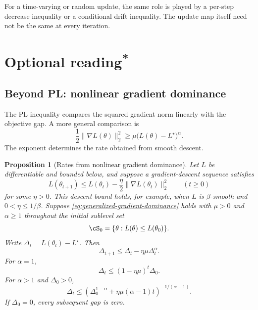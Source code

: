 \documentclass[11pt,twoside]{article}
\newcommand{\suppmark}{\texorpdfstring{\textsuperscript{*}}{*}}
\newtheorem{proposition}[theorem]{Proposition}
\theoremstyle{definition}
\theoremstyle{remark}
\begin{document}
For a time-varying or random update, the same role is played by a per-step
decrease inequality or a conditional drift inequality. The update map itself
need not be the same at every iteration.

\section{Optional reading\suppmark}
\label{sec:optional}

\subsection{Beyond PL: nonlinear gradient dominance}
\label{sec:generalized-gradient-dominance}

The PL inequality compares the squared gradient norm linearly with the
objective gap. A more general comparison is
\begin{equation}
 \frac12\|\nabla L(\theta)\|_2^2
 \ge \mu\bigl(L(\theta)-L^\star\bigr)^\alpha.
 \label{eq:generalized-gradient-dominance}
\end{equation}
The exponent determines the rate obtained from smooth descent.

\begin{proposition}[Rates from nonlinear gradient dominance]
\label{prop:generalized-gradient-dominance}
Let $L$ be differentiable and bounded below, and suppose a gradient-descent
sequence satisfies
\[
 L(\theta_{t+1})
 \le L(\theta_t)-\frac\eta2\|\nabla L(\theta_t)\|_2^2
 \qquad(t\ge0)
\]
for some $\eta>0$. This descent bound holds, for example, when $L$ is
$\beta$-smooth and $0<\eta\le1/\beta$. Suppose
\cref{eq:generalized-gradient-dominance} holds with $\mu>0$ and
$\alpha\ge1$ throughout the initial sublevel set
\[
 \cS_0=\{\theta:L(\theta)\le L(\theta_0)\}.
\]
Write $\Delta_t=L(\theta_t)-L^\star$. Then
\begin{equation}
 \Delta_{t+1}\le\Delta_t-\eta\mu\Delta_t^\alpha.
 \label{eq:generalized-gap-recursion}
\end{equation}
For $\alpha=1$,
\[
 \Delta_t\le(1-\eta\mu)^t\Delta_0.
\]
For $\alpha>1$ and $\Delta_0>0$,
\begin{equation}
 \Delta_t
 \le
 \left(\Delta_0^{1-\alpha}
       +\eta\mu(\alpha-1)t\right)^{-1/(\alpha-1)}.
 \label{eq:generalized-gap-rate}
\end{equation}
If $\Delta_0=0$, every subsequent gap is zero.
\end{proposition}
\end{document}

